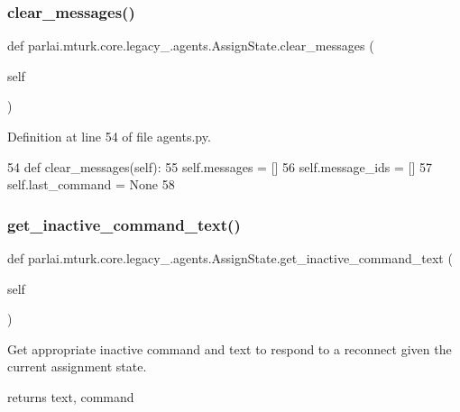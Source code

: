 \subsubsection{\texorpdfstring{clear\+\_\+messages()}{clear\_messages()}}
{\footnotesize\ttfamily def parlai.\+mturk.\+core.\+legacy\+\_.\+agents.\+Assign\+State.\+clear\+\_\+messages (\begin{DoxyParamCaption}\item[{}]{self }\end{DoxyParamCaption})}



Definition at line 54 of file agents.\+py.


\begin{DoxyCode}
54     \textcolor{keyword}{def }clear\_messages(self):
55         self.messages = []
56         self.message\_ids = []
57         self.last\_command = \textcolor{keywordtype}{None}
58 
\end{DoxyCode}
\mbox{\label{classparlai_1_1mturk_1_1core_1_1legacy__2018_1_1agents_1_1AssignState_a68d951e5683ae7b37acbbadbd8f74afa}} 
\subsubsection{\texorpdfstring{get\+\_\+inactive\+\_\+command\+\_\+text()}{get\_inactive\_command\_text()}}
{\footnotesize\ttfamily def parlai.\+mturk.\+core.\+legacy\+\_.\+agents.\+Assign\+State.\+get\+\_\+inactive\+\_\+command\+\_\+text (\begin{DoxyParamCaption}\item[{}]{self }\end{DoxyParamCaption})}

\begin{DoxyVerb}Get appropriate inactive command and text to respond to a reconnect given the
current assignment state.

returns text, command
\end{DoxyVerb}
 

